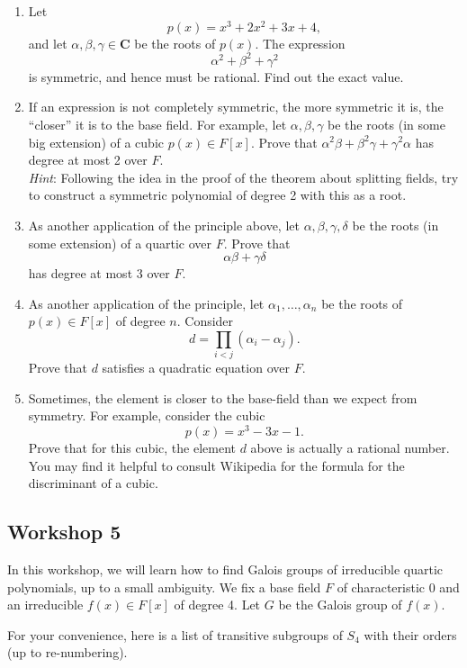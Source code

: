 \documentclass[11pt]{article}
\begin{document}
\begin{enumerate}
\item Let
\[ p(x) = x^3 + 2x^2 + 3x + 4,\]
and let \(\alpha, \beta, \gamma \in \mathbf{C}\) be the roots of \(p(x)\).
The expression
\[ \alpha^2 + \beta^2 + \gamma^{2}\]
is symmetric, and hence must be rational.
Find out the exact value.

\item If an expression is not completely symmetric, the more symmetric it is, the ``closer'' it is to the base field.
For example, let \(\alpha, \beta, \gamma\) be the roots (in some big extension) of a cubic \(p(x) \in F[x]\).
Prove that \(\alpha^2 \beta + \beta^2 \gamma + \gamma^2\alpha\) has degree at most 2 over \(F\).\\
\emph{Hint}: Following the idea in the proof of the theorem about splitting fields, try to construct a symmetric polynomial of degree 2 with this as a root.

\item As another application of the principle above, let \(\alpha, \beta, \gamma, \delta\) be the roots (in some extension) of a quartic over \(F\).
Prove that
\[ \alpha\beta + \gamma\delta\]
has degree at most 3 over \(F\).

\item As another application of the principle, let \(\alpha_1, \dots, \alpha_n\) be the roots of \(p(x) \in F[x]\) of degree \(n\).
Consider
\[ d = \prod_{i < j}(\alpha_i - \alpha_j).\]
Prove that \(d\) satisfies a quadratic equation over \(F\).

\item Sometimes, the element is closer to the base-field than we expect from symmetry.
For example, consider the cubic
\[ p(x) = x^3-3x-1.\]
Prove that for this cubic, the element \(d\) above is actually a rational number.
You may find it helpful to consult Wikipedia for the formula for the discriminant of a cubic.
\end{enumerate}
\subsection{Workshop 5}
\label{sec:org6ff3404}
In this workshop, we will learn how to find Galois groups of irreducible quartic polynomials, up to a small ambiguity.
We fix a base field \(F\) of characteristic 0 and an irreducible \(f(x) \in F[x]\) of degree 4.
Let \(G\) be the Galois group of \(f(x)\).

For your convenience, here is a list of transitive subgroups of \(S_{4}\) with their orders (up to re-numbering).
\end{document}

